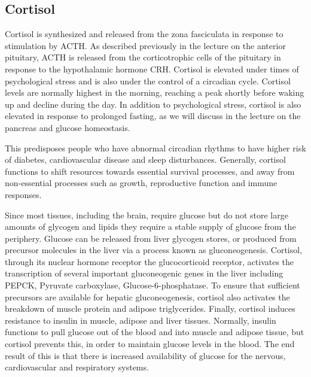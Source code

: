 \documentclass{tufte-handout}
\begin{document}
\subsection{Cortisol}

Cortisol is synthesized and released from the zona fasciculata in response to stimulation by ACTH.  As described previously in the lecture on the anterior pituitary, ACTH is released from the corticotrophic cells of the pituitary in response to the hypothalamic hormone CRH.  Cortisol is elevated under times of psychological stress and is also under the control of a circadian cycle.  Cortisol levels are normally highest in the morning, reaching a peak shortly before waking up and decline during the day.  In addition to psychological stress, cortisol is also elevated in response to prolonged fasting, as we will discuss in the lecture on the pancreas and glucose homeostasis.

  This predisposes people who have abnormal circadian rhythms to have higher risk of diabetes, cardiovascular disease and sleep disturbances\cite{Scheer2009,Pan2011}.  Generally, cortisol functions to shift resources towards essential survival processes, and away from non-essential processes such as growth, reproductive function and immune responses.

  Since most tissues, including the brain, require glucose but do not store large amounts of glycogen and lipids they require a stable supply of glucose from the periphery.  Glucose can be released from liver glycogen stores, or produced from precursor molecules in the liver via a process known as gluconeogenesis.  Cortisol, through its nuclear hormone receptor the glucocorticoid receptor, activates the transcription of several important gluconeogenic genes in the liver including PEPCK, Pyruvate carboxylase, Glucose-6-phosphatase.  To ensure that sufficient precursors are available for hepatic gluconeogenesis, cortisol also activates the breakdown of muscle protein and adipose triglycerides.  Finally, cortisol induces resistance to insulin in muscle, adipose and liver tissues.  Normally, insulin functions to pull glucose out of the blood and into muscle and adipose tissue, but cortisol prevents this, in order to maintain glucose levels in the blood.  The end result of this is that there is increased availability of glucose for the nervous, cardiovascular and respiratory systems.
\end{document}
